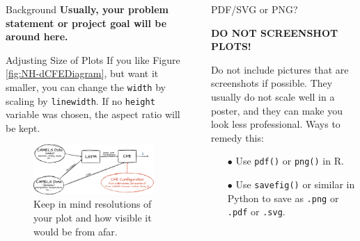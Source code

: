 \documentclass[final]{beamer}
\newlength{\sepwidth}
\newlength{\colwidth}
\newcommand{\separatorcolumn}{\begin{column}{\sepwidth}\end{column}}
\begin{document}
\begin{frame}[t]
\begin{columns}[t]
\begin{column}{\colwidth}
\begin{block}{Background}
\textbf{Usually, your problem statement or project goal will be around here. }
\end{block}

\begin{block}{Adjusting Size of Plots}
If you like Figure \ref{fig:NH-dCFEDiagram}, but want it smaller, you can change the \texttt{width} by scaling by \texttt{linewidth}. If no \texttt{height} variable was chosen, the aspect ratio will be kept. 
\vspace{0.25in}
\begin{figure}[h]
	\centering
	\includegraphics[width=0.7\linewidth]{Images/NH-dCFEDiagram.png}
	\vspace{0.2in}
	\caption{Keep in mind resolutions of your plot and how visible it would be from afar.  }
	\label{fig:NH-dCFEDiagram_small}
\end{figure} 

\end{block}

 
\end{column}

\separatorcolumn
\begin{column}{\colwidth}
\begin{block}{PDF/SVG or PNG?}

\begin{center}
{\huge \textcolor{redFlannel}{\textbf{DO NOT SCREENSHOT PLOTS!}}}
\end{center}

Do not include pictures that are screenshots if possible. They usually do not scale well in a poster, and they can make you look less professional.  Ways to remedy this:

\begin{itemize}
	\item[\large\color{blasterBlue}$\bullet$] Use \texttt{pdf()} or \texttt{png()} in R. 
	\item[\large\color{blasterBlue}$\bullet$] Use \texttt{savefig()} or similar in Python to save as \texttt{.png} or \texttt{.pdf} or \texttt{.svg}. 
\end{itemize}


\end{block}
\end{column}
\end{columns}
\end{frame}
\end{document}
